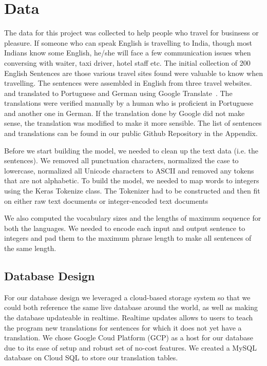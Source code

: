 \documentclass[runningheads]{llncs}
\begin{document}
	\section{Data}
	The data for this project was collected to help people who travel for businsess or pleasure.  If someone who can speak English is travelling to India, though most Indians know some English, he/she will face a few communication issues when conversing with waiter, taxi driver, hotel staff etc. The initial collection of 200 English Sentences are those various travel sites found were valuable to know when travelling. The sentences were assembled in English from three travel websites.~\cite{ref_url11,ref_url12,ref_url13} and translated to Portuguese and German using Google Translate~\cite{ref_url14}. The translations were verified manually by a human who is proficient in Portuguese and another one in German. If the translation done by Google did not make sense, the translation was modified to make it more sensible. The list of sentences and translations can be found in our public Github Repository in the Appendix.
	
	Before we start building the model, we needed to clean up the text data (i.e. the sentences). We removed all punctuation characters, normalized the case to lowercase, normalized all Unicode characters to ASCII and removed any tokens that are not alphabetic. To build the model, we needed to map words to integers  using the Keras Tokenize class. The Tokenizer had to be constructed and then fit on either raw text documents or integer-encoded text documents
	
	We also computed the vocabulary sizes and the lengths of maximum sequence for both the languages. We needed to encode each input and output sentence to integers and pad them to the maximum phrase length to make all sentences of the same length. 
	
	\subsection{Database Design}
	For our database design we leveraged a cloud-based storage system so that we could both reference the same live database around the world, as well as making the database updateable in realtime. Realtime updates allows to users to teach the program new translations for sentences for which it does not yet have a translation. We chose Google Coud Platform (GCP) as a host for our database due to its ease of setup and robust set of no-cost features. We created a MySQL database on Cloud SQL to store our translation tables.
	
\end{document}
